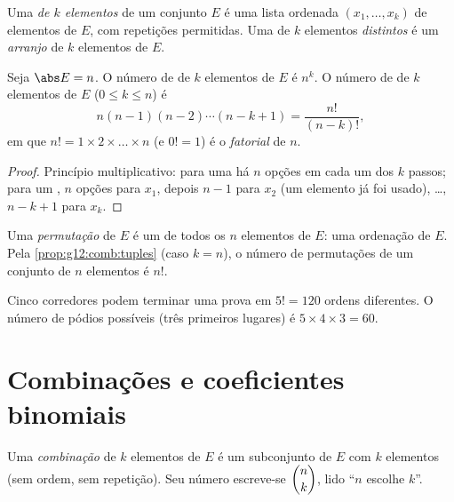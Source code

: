 \begin{definition}\label{def:g12:comb:tuples}
Uma \emph{ de $k$ elementos} de um conjunto $E$ é uma lista
ordenada $(x_1, \dots, x_k)$ de elementos de $E$, com repetições
permitidas. Uma  de $k$ elementos \emph{distintos} é um
\emph{arranjo} de $k$ elementos de $E$.
\end{definition}

\begin{proposition}\label{prop:g12:comb:tuples}
Seja $\abs E = n$. O número de  de $k$ elementos de $E$ é $n^k$.
O número de  de $k$ elementos de $E$ ($0 \leq k \leq n$) é
\[
n(n-1)(n-2)\cdots(n-k+1) = \frac{n!}{(n-k)!},
\]
em que $n! = 1 \times 2 \times \dots \times n$ (e $0! = 1$) é o
\emph{fatorial} de $n$.
\end{proposition}

\begin{proof}
Princípio multiplicativo: para uma  há $n$ opções em cada um dos
$k$ passos; para um , $n$ opções para $x_1$, depois $n - 1$ para
$x_2$ (um elemento já foi usado), \dots, $n - k + 1$ para $x_k$.
\end{proof}

\begin{definition}[Permutação]\label{def:g12:comb:permutation}
Uma \emph{permutação} de $E$ é um  de todos os $n$
elementos de $E$: uma ordenação de $E$. Pela
\cref{prop:g12:comb:tuples} (caso $k = n$), o número de permutações de um
conjunto de $n$ elementos é $n!$.
\end{definition}

\begin{example}
Cinco corredores podem terminar uma prova em $5! = 120$ ordens diferentes.
O número de pódios possíveis (três primeiros lugares) é
$5 \times 4 \times 3 = 60$.
\end{example}

\section{Combinações e coeficientes binomiais}

\begin{definition}[Combinações]\label{def:g12:comb:combination}
Uma \emph{combinação} de $k$ elementos de $E$ é um
subconjunto de $E$ com $k$ elementos (sem ordem, sem repetição). Seu número
escreve-se $\dbinom{n}{k}$, lido ``$n$ escolhe
$k$''.
\end{definition}

